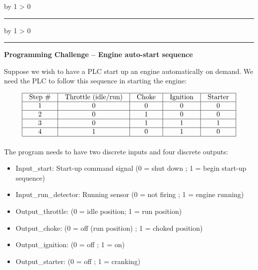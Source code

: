 \documentclass[12pt,a4paper]{article}
\def\oppgave{
            \advance\questnum by 1
            \ifnum \questnum > 0
                 \hrule
                 \vskip 3pt
                 \leftline{Oppgave \the\questnum}
                 \vskip 3pt \fi}
\def\notes{
           \advance\explnum by 1
           \ifnum \explnum > 0
                \hrule
                \vskip 3pt
                \leftline{Notes \the\explnum}
                \vskip 3pt \fi}
\begin{document}
\vskip 10pt \filbreak 





\notes{} 




\vfil \eject 





\oppgave{} 

\noindent
{\bf Programming Challenge -- Engine auto-start sequence}

\vskip 10pt

Suppose we wish to have a PLC start up an engine automatically on demand.  We need the PLC to follow this sequence in starting the engine:


$$\vbox{\offinterlineskip
\halign{\strut
\vrule \quad\hfil # \ \hfil & 
\vrule \quad\hfil # \ \hfil & 
\vrule \quad\hfil # \ \hfil & 
\vrule \quad\hfil # \ \hfil & 
\vrule \quad\hfil # \ \hfil \vrule \cr
\noalign{\hrule}
%
Step \# & Throttle (idle/run) & Choke & Ignition & Starter \cr
%
\noalign{\hrule}
%
1 & 0 & 0 & 0 & 0 \cr
%
\noalign{\hrule}
%
2 & 0 & 1 & 0 & 0 \cr
%
\noalign{\hrule}
%
3 & 0 & 1 & 1 & 1 \cr
%
\noalign{\hrule}
%
4 & 1 & 0 & 1 & 0 \cr
%
\noalign{\hrule}
} %
}$$ %

The program needs to have two discrete inputs and four discrete outputs:

\begin{itemize}
\item{} Input\_start: Start-up command signal (0 = shut down ; 1 = begin start-up sequence)
\item{} Input\_run\_detector: Running sensor (0 = not firing ; 1 = engine running)
\vskip 5pt
\item{} Output\_throttle: (0 = idle position; 1 = run position)
\item{} Output\_choke: (0 = off (run position) ; 1 = choked position)
\item{} Output\_ignition: (0 = off ; 1 = on)
\item{} Output\_starter: (0 = off ; 1 = cranking)
\end{itemize}
\end{document}
